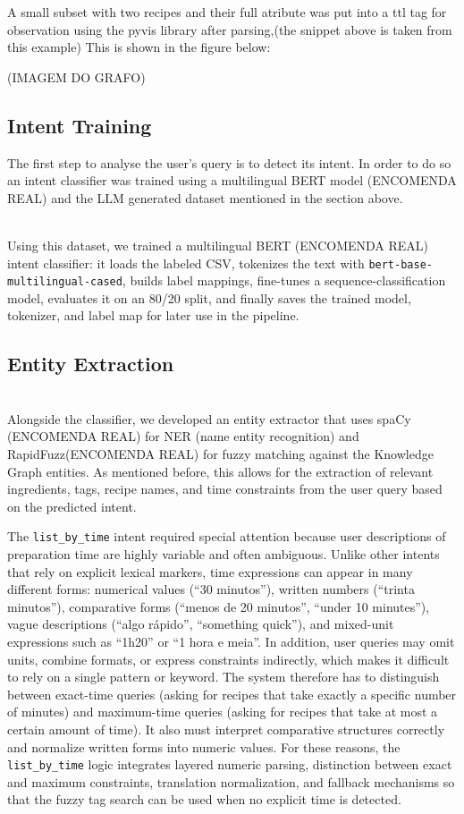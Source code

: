\documentclass[conference]{IEEEtran}
\begin{document}
A small subset with two recipes and their full atribute was put into a ttl tag for observation using the pyvis library after parsing,(the snippet above is taken from this example) This is shown in the figure below:  

(IMAGEM DO GRAFO)

\subsection{Intent Training}
\noindent
The first step to analyse the user's query is to detect its intent. In order to do so an intent classifier was trained using a multilingual BERT model (ENCOMENDA REAL) and the LLM generated dataset mentioned in the section above. 



\noindent
\\
 Using this dataset, we trained a multilingual BERT (ENCOMENDA REAL) intent classifier: it loads the labeled CSV, tokenizes the text with \texttt{bert-base-multilingual-cased}, builds label mappings, fine-tunes a sequence-classification model, evaluates it on an 80/20 split, and finally saves the trained model, tokenizer, and label map for later use in the pipeline.
 
 
\subsection{Entity Extraction}
 

 \noindent
\\
 Alongside the classifier, we developed an entity extractor that uses spaCy (ENCOMENDA REAL) for NER (name entity recognition) and RapidFuzz(ENCOMENDA REAL) for fuzzy matching against the Knowledge Graph entities. As mentioned before, this allows for the extraction of relevant ingredients, tags, recipe names, and time constraints from the user query based on the predicted intent.


The \texttt{list\_by\_time} intent required special attention because user descriptions of preparation time are highly variable and often ambiguous. Unlike other intents that rely on explicit lexical markers, time expressions can appear in many different forms: numerical values (``30 minutos''), written numbers (``trinta minutos''), comparative forms (``menos de 20 minutos'', ``under 10 minutes''), vague descriptions (``algo rápido'', ``something quick''), and mixed-unit expressions such as ``1h20'' or ``1 hora e meia''. In addition, user queries may omit units, combine formats, or express constraints indirectly, which makes it difficult to rely on a single pattern or keyword. The system therefore has to distinguish between exact-time queries (asking for recipes that take exactly a specific number of minutes) and maximum-time queries (asking for recipes that take at most a certain amount of time). It also must interpret comparative structures correctly and normalize written forms into numeric values. For these reasons, the \texttt{list\_by\_time} logic integrates layered numeric parsing, distinction between exact and maximum constraints, translation normalization, and fallback mechanisms so that the fuzzy tag search can be used when no explicit time is detected.
\end{document}
